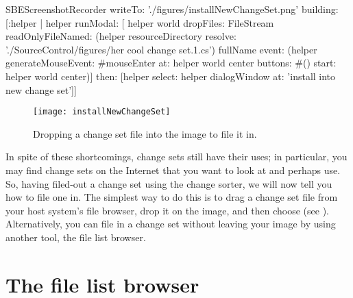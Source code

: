 \documentclass[a4paper,10pt,twoside]{book}
\begin{document}
\begin{ExecuteSmalltalkScript}
SBEScreenshotRecorder writeTo: './figures/installNewChangeSet.png' building: [:helper |
	helper
		runModal: [
			helper world
				dropFiles: {FileStream readOnlyFileNamed: (helper resourceDirectory resolve: './SourceControl/figures/her cool change set.1.cs') fullName}
				event: (helper generateMouseEvent: #mouseEnter at: helper world center buttons: #() start: helper world center)]
		then: [helper select: helper dialogWindow at: 'install into new change set']]
\end{ExecuteSmalltalkScript}
\begin{figure}
	\begin{center}
		\texttt{[image: installNewChangeSet]}
	\end{center}
	\caption{Dropping a change set file into the image to file it in.}
	\label{fig:installNewChangeSet}
\end{figure}

In spite of these shortcomings, change sets still have their uses; in particular, you may find change sets on the Internet that you want to look at and perhaps use.
So, having filed-out a change set using the change sorter, we will now tell you how to file one in.
The simplest way to do this is to drag a change set file from your host system's file browser, drop it on the \sq image, and then choose  (see ).
Alternatively, you can file in a change set without leaving your \sq image by using another tool, the file list browser.


\section{The file list browser}
\end{document}
